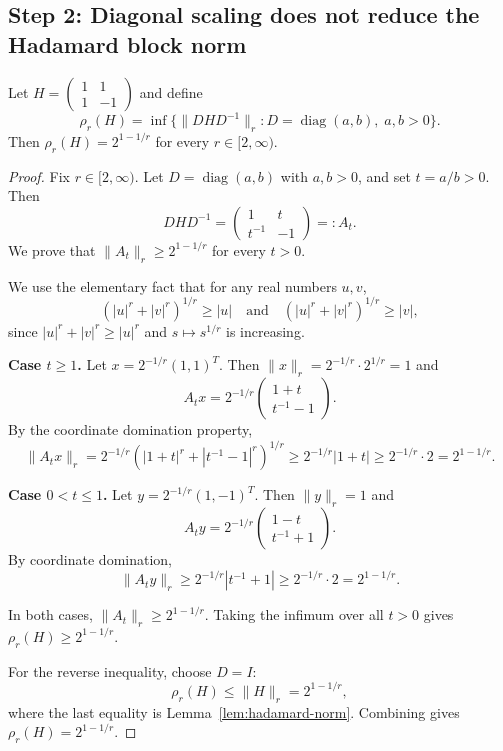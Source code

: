 \subsection*{Step 2: Diagonal scaling does not reduce the Hadamard block norm}

\begin{lemma}\label{lem:rho-hadamard}
Let $H = \begin{pmatrix} 1 & 1 \\ 1 & -1 \end{pmatrix}$ and define
\[
\rho_r(H) = \inf\{\|DHD^{-1}\|_r : D = \operatorname{diag}(a,b),\; a,b>0\}.
\]
Then $\rho_r(H) = 2^{1-1/r}$ for every $r \in [2,\infty)$.
\end{lemma}

\begin{proof}
Fix $r \in [2,\infty)$. Let $D=\operatorname{diag}(a,b)$ with $a,b>0$, and set $t=a/b>0$. Then
\[
DHD^{-1} = \begin{pmatrix} 1 & t \\ t^{-1} & -1 \end{pmatrix} =: A_t.
\]
We prove that $\|A_t\|_r \geq 2^{1-1/r}$ for every $t>0$.

We use the elementary fact that for any real numbers $u,v$,
\[
(|u|^r+|v|^r)^{1/r} \geq |u| \quad\text{and}\quad (|u|^r+|v|^r)^{1/r} \geq |v|,
\]
since $|u|^r+|v|^r \geq |u|^r$ and $s \mapsto s^{1/r}$ is increasing.

\textbf{Case $t\geq 1$.} Let $x=2^{-1/r}(1,1)^T$. Then $\|x\|_r = 2^{-1/r}\cdot 2^{1/r} = 1$ and
\[
A_t x = 2^{-1/r}\begin{pmatrix} 1+t \\ t^{-1}-1 \end{pmatrix}.
\]
By the coordinate domination property,
\[
\|A_t x\|_r = 2^{-1/r}(|1+t|^r+|t^{-1}-1|^r)^{1/r} \geq 2^{-1/r}|1+t| \geq 2^{-1/r}\cdot 2 = 2^{1-1/r}.
\]

\textbf{Case $0<t\leq 1$.} Let $y=2^{-1/r}(1,-1)^T$. Then $\|y\|_r = 1$ and
\[
A_t y = 2^{-1/r}\begin{pmatrix} 1-t \\ t^{-1}+1 \end{pmatrix}.
\]
By coordinate domination,
\[
\|A_t y\|_r \geq 2^{-1/r}|t^{-1}+1| \geq 2^{-1/r}\cdot 2 = 2^{1-1/r}.
\]

In both cases, $\|A_t\|_r \geq 2^{1-1/r}$. Taking the infimum over all $t>0$ gives $\rho_r(H)\geq 2^{1-1/r}$.

For the reverse inequality, choose $D=I$:
\[
\rho_r(H) \leq \|H\|_r = 2^{1-1/r},
\]
where the last equality is Lemma~\ref{lem:hadamard-norm}. Combining gives $\rho_r(H)=2^{1-1/r}$.
\end{proof}
